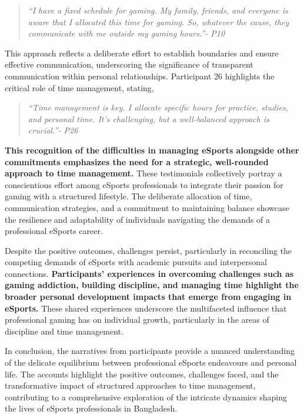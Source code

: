 \documentclass[manuscript,screen,review,anonymous]{acmart}
\begin{document}
\begin{quote}
{\emph{``I have a fixed schedule for gaming. My family, friends, and everyone is aware that I allocated this time for gaming. So, whatever the cause, they communicate with me outside my gaming hours.''- P10}}
\end{quote}

This approach reflects a deliberate effort to establish boundaries and ensure effective communication, underscoring the significance of transparent communication within personal relationships. Participant 26 highlights the critical role of time management, stating,

\begin{quote}
{\emph{``Time management is key. I allocate specific hours for practice, studies, and personal time. It's challenging, but a well-balanced approach is crucial.''- P26}}
\end{quote}

\textbf{This recognition of the difficulties in managing eSports alongside other commitments emphasizes the need for a strategic, well-rounded approach to time management.} These testimonials collectively portray a conscientious effort among eSports professionals to integrate their passion for gaming with a structured lifestyle. The deliberate allocation of time, communication strategies, and a commitment to maintaining balance showcase the resilience and adaptability of individuals navigating the demands of a professional eSports career. 

Despite the positive outcomes, challenges persist, particularly in reconciling the competing demands of eSports with academic pursuits and interpersonal connections. \textbf{Participants' experiences in overcoming challenges such as gaming addiction, building discipline, and managing time highlight the broader personal development impacts that emerge from engaging in eSports.} These shared experiences underscore the multifaceted influence that professional gaming has on individual growth, particularly in the areas of discipline and time management.

In conclusion, the narratives from participants provide a nuanced understanding of the delicate equilibrium between professional eSports endeavours and personal life. The accounts highlight the positive outcomes, challenges faced, and the transformative impact of structured approaches to time management, contributing to a comprehensive exploration of the intricate dynamics shaping the lives of eSports professionals in Bangladesh.
\end{document}

